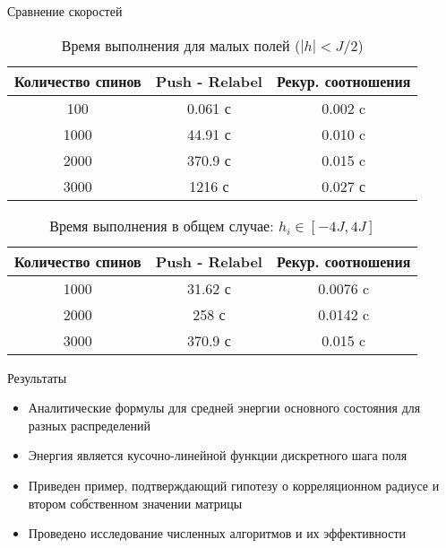 \documentclass{beamer}
\begin{document}
\begin{frame}{Сравнение скоростей}
    \begin{table}[h!]
\centering
\begin{tabular}{ |c|c|c| } 
	\hline
	Количество спинов & Push - Relabel & Рекур. соотношения \\
	\hline
	100 & 0.061 с & 0.002 c\\
	\hline
	1000 & 44.91 с & 0.010 c \\
	\hline
	2000 & 370.9 с & 0.015 c \\
	\hline
	3000 & 1216 с & 0.027 с \\
	\hline
\end{tabular}
	\caption{Время выполнения для малых полей ($|h|<J/2$)}
	\label{table1}
\end{table}
\begin{table}[h!]
	\centering
	\begin{tabular}{ |c|c|c| } 
		\hline
		Количество спинов & Push - Relabel & Рекур. соотношения \\
		\hline
		1000 & 31.62 с & 0.0076 c\\
		\hline
		2000 & 258 с & 0.0142 c \\
		\hline
		3000 & 370.9 с & 0.015 c \\
		\hline
	\end{tabular}
	\caption{Время выполнения в общем случае: $h_i \in [-4J, 4J]$}
	\label{table3}
\end{table}


\end{frame}
\begin{frame}{Результаты}
\begin{itemize}
    \item Аналитические формулы для средней энергии основного состояния для разных распределений
    \item Энергия является кусочно-линейной функции дискретного шага поля
    \item Приведен пример, подтверждающий гипотезу о корреляционном радиусе и втором собственном значении матрицы
    \item Проведено исследование численных алгоритмов и их эффективности
\end{itemize}

\end{frame}
\end{document}
